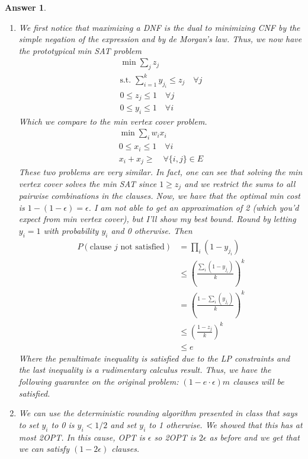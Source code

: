 \documentclass[12pt]{article}
\theoremstyle{colon}
\newtheorem*{answer}{Answer}
\begin{document}
\begin{answer}
  \leavevmode
  \begin{enumerate}[label=\alph*)]
    \item We first notice that maximizing a DNF is the dual to minimizing CNF by the simple negation of the expression and by de Morgan's law. Thus, we now have the prototypical min SAT problem
      \begin{gather*}
        \min \sum_j z_j \\
        \text{s.t. } \sum_{i = 1}^k y_{j_i} \leq z_j \quad \forall j \\
        0 \leq z_j \leq 1 \quad \forall j \\
        0 \leq y_i \leq 1 \quad \forall i
      \end{gather*}
      Which we compare to the min vertex cover problem.
      \begin{gather*}
        \min \sum_i w_i x_i \\
        0 \leq x_i \leq 1 \quad \forall i \\
        x_i + x_j \geq \quad \forall \{i,j\} \in E
      \end{gather*}
      These two problems are very similar. In fact, one can see that solving the min vertex cover solves the min SAT since $1 \geq z_j$ and we restrict the sums to all pairwise combinations in the clauses. Now, we have that the optimal min cost is $1 - (1-\epsilon) = \epsilon$. I am not able to get an approximation of 2 (which you'd expect from min vertex cover), but I'll show my best bound. Round by letting $y_i = 1$ with probability $y_i$ and 0 otherwise. Then
      \begin{align*}
        P(\text{clause } j \text{ not satisfied}) &= \prod_{i} (1-y_{j_i}) \\
        &\leq \left( \frac{\sum_i (1-y_{j_i})}{k} \right)^k \\
        &= \left( \frac{1 - \sum_i (y_{j_i})}{k} \right)^k \\
        &\leq \left( \frac{1 - z_j}{k} \right)^k \\
        &\leq e
      \end{align*}
      Where the penultimate inequality is satisfied due to the LP constraints and the last inequality is a rudimentary calculus result. Thus, we have the following guarantee on the original problem: $(1 - e \cdot \epsilon)m$ clauses will be satisfied.

    \item We can use the deterministic rounding algorithm presented in class that says to set $y_i$ to 0 is $y_i < 1/2$ and set $y_i$ to 1 otherwise. We showed that this has at most 2OPT. In this cause, OPT is $\epsilon$ so 2OPT is $2\epsilon$ as before and we get that we can satisfy $(1-2\epsilon)$ clauses.
  \end{enumerate}
\end{answer}
\end{document}
